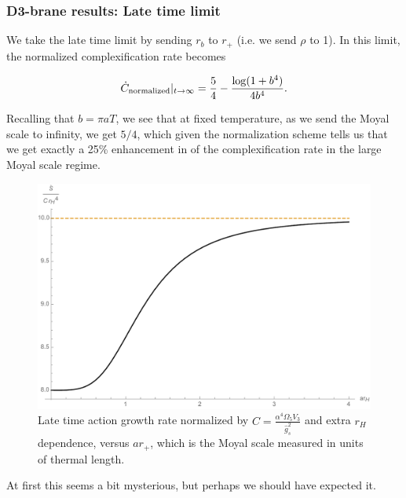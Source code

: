 \documentclass[8pt,aspectratio=169]{beamer}
\begin{document}
\begin{frame}
\frametitle{D3-brane results: Late time limit}

We take the late time limit by sending $r_b$ to $r_+$ (i.e. we send $\rho$ to 1). In this limit, the normalized complexification rate becomes

\begin{equation}
\dot{C}_{\text{normalized}} \large|_{t\rightarrow \infty} = \frac{5}{4}-\frac{\log(1+b^4)}{4 b^4}.
\end{equation}

Recalling that $b = \pi a T$, we see that at fixed temperature, as we send the Moyal scale to infinity, we get $5/4$, which given the normalization scheme tells us that we get exactly a 25\% enhancement in of the complexification rate in the large Moyal scale regime.

\begin{figure}[htbp]
    \begin{center}
        \includegraphics[scale=0.3]{LateTime}
    \end{center}
    \caption{Late time action growth rate normalized by $C=\frac{\alpha^4 \Omega_5 V_3}{\hat{g}_s^2}$ and extra $r_H$ dependence, versus $a r_+$, which is the Moyal scale measured in units of thermal length.} 
    \label{fig:LateTime}
\end{figure}

At first this seems a bit mysterious, but perhaps we should have expected it.

\end{frame}
\end{document}
